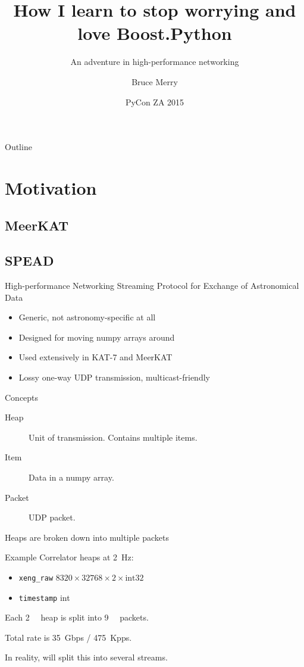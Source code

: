 \documentclass{beamer}
\title[Boost.Python]{How I learn to stop worrying and love Boost.Python}
\subtitle{An adventure in high-performance networking}
\author{Bruce Merry}
\institute[SKA SA]{SKA South Africa}
\date{PyCon ZA 2015}
\begin{document}
\begin{frame}
  \titlepage
\end{frame}

\begin{frame}{Outline}
  \tableofcontents
\end{frame}

\section{Motivation}

\subsection{MeerKAT}

\subsection{SPEAD}

\begin{frame}{High-performance Networking}
  \alert{S}treaming \alert{P}rotocol for \alert{E}xchange of
  \alert{A}stronomical \alert{D}ata
  \begin{itemize}
    \item Generic, not astronomy-specific at all
    \item Designed for moving numpy arrays around
    \item Used extensively in KAT-7 and MeerKAT
    \item Lossy one-way UDP transmission, multicast-friendly
  \end{itemize}
\end{frame}

\begin{frame}{Concepts}
  \begin{description}
    \item[Heap] Unit of transmission. Contains multiple items.
    \item[Item] Data in a numpy array.
    \item[Packet] UDP packet.
  \end{description}
  Heaps are broken down into multiple packets
\end{frame}

\begin{frame}{Example}
  Correlator heaps at \SI{2}{\Hz}:
  \begin{itemize}
    \item \texttt{xeng_raw} $8320\times 32768\times 2\times \text{int32}$
    \item \texttt{timestamp} int
  \end{itemize}
  Each \SI{2}{\gibi\byte} heap is split into \SI{9}{\kilo\byte} packets.

  \pause
  Total rate is \SI{35}{Gbps} / \SI{475}{Kpps}.

  \pause
  In reality, will split this into several streams.
\end{frame}
\end{document}
